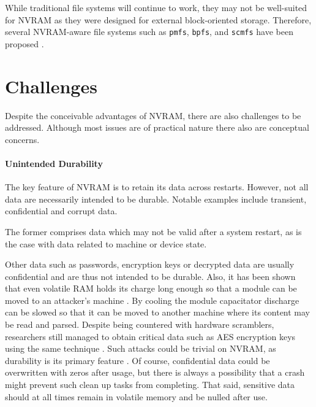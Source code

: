 While traditional file systems will continue to work, they may not be
well-suited for NVRAM as they were designed for external block-oriented
storage. Therefore, several NVRAM-aware file systems such as \texttt{pmfs},
\texttt{bpfs}, and \texttt{scmfs} have been proposed \cite{condit2009better,
wu2011scmfs, dulloor2014system}.




\section{Challenges}

Despite the conceivable advantages of NVRAM, there are also challenges to be
addressed. Although most issues are of practical nature there also are
conceptual concerns.

\paragraph{Unintended Durability}

The key feature of NVRAM is to retain its data across restarts. However, not all
data are necessarily intended to be durable. Notable examples include transient,
confidential and corrupt data.

The former comprises data which may not be valid after a system restart, as is
the case with data related to machine or device state.

Other data such as passwords, encryption keys or decrypted data are usually
confidential and are thus not intended to be durable. Also, it has been shown
that even volatile RAM holds its charge long enough so that a module can be
moved to an attacker's machine \cite{halderman2008lest}. By cooling the module
capacitator discharge can be slowed so that it can be moved to another machine
where its content may be read and parsed. Despite being countered with hardware
scramblers, researchers still managed to obtain critical data such as AES
encryption keys using the same technique \cite{yitbarek2017cold}. Such attacks
could be trivial on NVRAM, as durability is its primary feature
\cite{bailey2011operating}. Of course, confidential data could be overwritten
with zeros after usage, but there is always a possibility that a crash might
prevent such clean up tasks from completing. That said, sensitive data should at
all times remain in volatile memory and be nulled after use.

